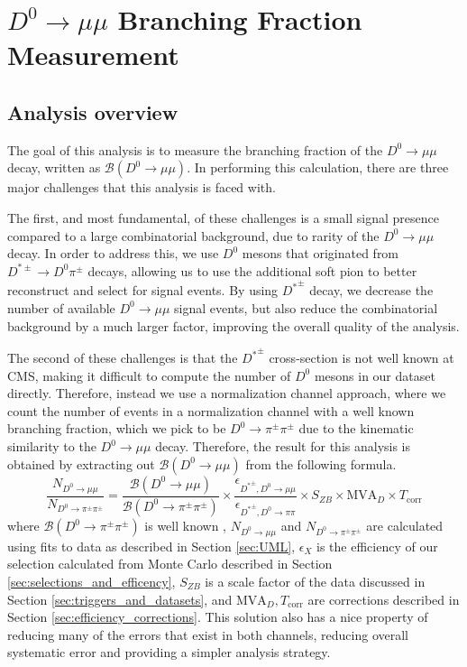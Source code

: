 \chapter{$D^0 \to \mu\mu$ Branching Fraction Measurement}
\label{ch:4}

\section{Analysis overview}

\label{sec:analysis_overview}

The goal of this analysis is to measure the branching fraction of the $D^0 \to \mu \mu$ decay, written as $\mathcal{B}(D^0 \to \mu \mu)$. In performing this calculation, there are three major challenges that this analysis is faced with. 

The first, and most fundamental, of these challenges is a small signal presence compared to a large combinatorial background, due to rarity of the $D^0 \to \mu \mu$ decay. In order to address this, we use $D^0$ mesons that originated from $D^{*\pm} \to D^0 \pi^\pm$ decays, allowing us to use the additional soft pion to better reconstruct and select for signal events. By using ${D^*}^\pm$ decay, we decrease the number of available $D^0 \to \mu \mu$ signal events, but also reduce the combinatorial background by a much larger factor, improving the overall quality of the analysis. 

The second of these challenges is that the ${D^*}^\pm$ cross-section is not well known at CMS, making it difficult to compute the number of $D^0$ mesons in our dataset directly. Therefore, instead we use a normalization channel approach, where we count the number of events in a normalization channel with a well known branching fraction, which we pick to be $D^0 \to \pi^\pm \pi^\pm$ due to the kinematic similarity to the $D^0 \to \mu \mu$ decay. Therefore, the result for this analysis is obtained by extracting out $\mathcal{B}(D^0 \to \mu \mu)$ from the following formula.
\begin{equation}
    \frac{N_{D^0 \to \mu  \mu}}{N_{D^0 \to \pi^\pm \pi^\pm}} = \frac{\mathcal{B}(D^0 \to \mu \mu)}{\mathcal{B}(D^0 \to \pi^\pm \pi^\pm)}\times \frac{\epsilon_{{D^*}^\pm, D^0\to\mu\mu}}{\epsilon_{{D^*}^\pm, D^0\to\pi\pi}} \times S_{ZB} \times \text{MVA}_D \times T_{\text{corr}} 
\label{eq:main_analysis}
\end{equation}
where $\mathcal{B}(D^0 \to \pi^\pm \pi^\pm)$ is well known \cite{ref:pdg2024}, $N_{D^0 \to \mu\mu}$ and $N_{D^0 \to \pi^\pm \pi^\pm}$ are calculated using fits to data as described in Section \ref{sec:UML}, $\epsilon_X$ is the efficiency of our selection calculated from Monte Carlo described in Section \ref{sec:selections_and_efficency}, $S_{ZB}$ is a scale factor of the data discussed in Section \ref{sec:triggers_and_datasets}, and $\text{MVA}_D,T_{\text{corr}}$ are corrections described in Section \ref{sec:efficiency_corrections}. This solution also has a nice property of reducing many of the errors that exist in both channels, reducing overall systematic error and providing a simpler analysis strategy.

